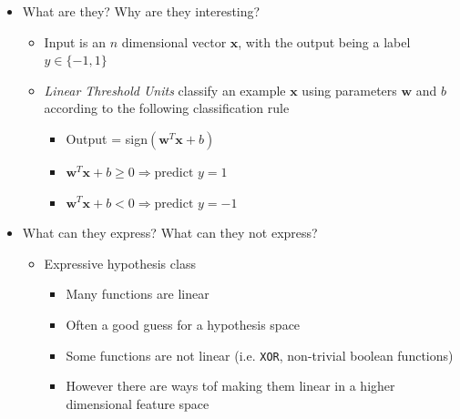 \documentclass{article}
\begin{document}
\hspace{-1.5em}{\large \bf Linear Classifiers}
\begin{itemize}
\item What are they? Why are they interesting?
	\begin{itemize}
	\item Input is an $n$ dimensional vector $\mathbf{x}$, with the output being a label $y\in \{-1,1\}$
	\item {\em Linear Threshold Units} classify an example $\mathbf{x}$ using parameters $\mathbf{w}$ and $b$ according to the following classification rule
		\begin{itemize}
		\item Output = sign$(\mathbf{w}^{T}\mathbf{x} + b)$
		\item $\mathbf{w}^{T}\mathbf{x} + b \geq 0 \Rightarrow \text{predict } y = 1$
		\item $\mathbf{w}^{T}\mathbf{x} + b < 0 \Rightarrow \text{predict } y = -1$
		\end{itemize}
	\end{itemize}
\item What can they express? What can they not express?
	\begin{itemize}
	\item Expressive hypothesis class
		\begin{itemize}
		\item Many functions are linear
		\item Often a good guess for a hypothesis space
		\item Some functions are not linear (i.e. \verb~XOR~, non-trivial boolean functions)
		\item However there are ways tof making them linear in a higher dimensional feature space
		\end{itemize}


\end{itemize}
\end{itemize}
\end{document}
